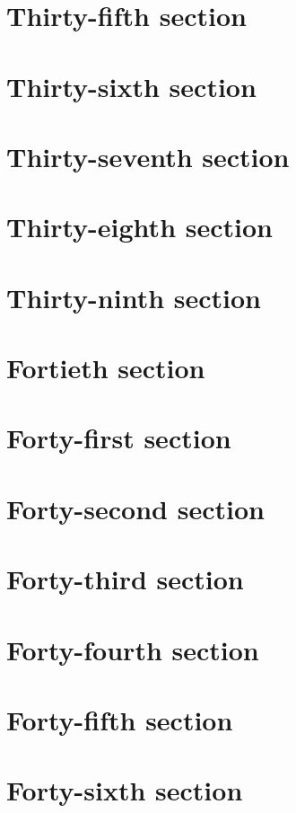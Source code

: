 \documentclass[oneside]{book}
\begin{document}
\begin{multicols}{2}
\section{Thirty-fifth section}    
\section{Thirty-sixth section}    
\section{Thirty-seventh section}  
\section{Thirty-eighth section}   
\section{Thirty-ninth section}    
\section{Fortieth section}        
\section{Forty-first section}     
\section{Forty-second section}    
\section{Forty-third section}     
\section{Forty-fourth section}    
\section{Forty-fifth section}     
\section{Forty-sixth section}     

\end{multicols}
\end{document}
